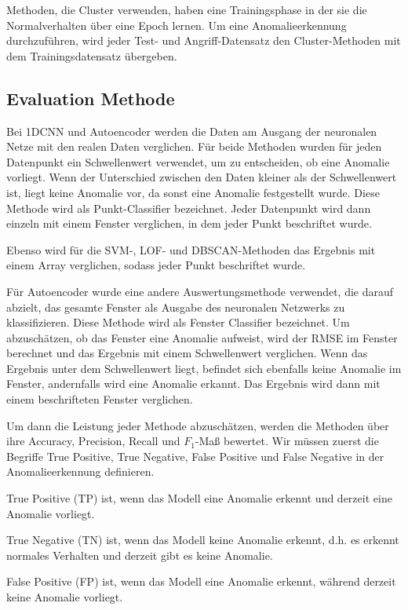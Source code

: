 \documentclass[12pt,a4paper]{scrartcl}
\numberwithin{equation}{section}
\begin{document}
Methoden, die Cluster verwenden, haben eine Trainingsphase in der sie die Normalverhalten über eine Epoch lernen. Um eine Anomalieerkennung durchzuführen, wird jeder Test- und Angriff-Datensatz den Cluster-Methoden mit dem Trainingsdatensatz übergeben. 

\subsection{Evaluation Methode}

Bei 1DCNN und Autoencoder werden die Daten am Ausgang der neuronalen Netze mit den realen Daten verglichen. Für beide Methoden wurden für jeden Datenpunkt ein Schwellenwert verwendet, um zu entscheiden, ob eine Anomalie vorliegt. Wenn der Unterschied zwischen den Daten kleiner als der Schwellenwert ist, liegt keine Anomalie vor, da sonst eine Anomalie festgestellt wurde. Diese Methode wird als Punkt-Classifier bezeichnet. Jeder Datenpunkt wird dann einzeln mit einem Fenster verglichen, in dem jeder Punkt beschriftet wurde.

Ebenso wird für die SVM-, LOF- und DBSCAN-Methoden das Ergebnis mit einem Array verglichen, sodass jeder Punkt beschriftet wurde.

Für Autoencoder wurde eine andere Auswertungsmethode verwendet, die darauf abzielt, das gesamte Fenster als Ausgabe des neuronalen Netzwerks zu klassifizieren. Diese Methode wird als Fenster Classifier bezeichnet. Um abzuschätzen, ob das Fenster eine Anomalie aufweist, wird der RMSE im Fenster berechnet und das Ergebnis mit einem Schwellenwert verglichen. Wenn das Ergebnis unter dem Schwellenwert liegt, befindet sich ebenfalls keine Anomalie im Fenster, andernfalls wird eine Anomalie erkannt. Das Ergebnis wird dann mit einem beschrifteten Fenster verglichen.

Um dann die Leistung jeder Methode abzuschätzen, werden die Methoden über ihre Accuracy, Precision, Recall und $ F_{1}$-Maß bewertet. Wir müssen zuerst die Begriffe True Positive, True Negative, False Positive und False Negative in der Anomalieerkennung definieren.

True Positive (TP) ist, wenn das Modell eine Anomalie erkennt und derzeit eine Anomalie vorliegt.

True Negative (TN) ist, wenn das Modell keine Anomalie erkennt, d.h. es erkennt normales Verhalten und derzeit gibt es keine Anomalie.

False Positive (FP) ist, wenn das Modell eine Anomalie erkennt, während derzeit keine Anomalie vorliegt.
\end{document}

